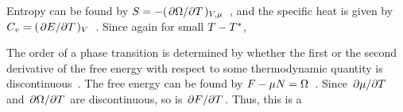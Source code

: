 {	Entropy can be found by $S = -(\pdv*{\Omega}{T})_{V, \mu}$~\cite[p.~150]{Landau}, and the specific heat is given by $C_v = (\pdv*{E}{T})_V$~\cite[p.~165]{Landau}.  Since
	again for small $T - T^*$,
	
	The order of a phase transition is determined by whether the first or the second derivative of the free energy with respect to some thermodynamic quantity is discontinuous~\cite{Wikipedia}.  The free energy can be found by $F - \mu N = \Omega$~\cite[p.~69]{Landau}.  Since $\pdv*{\mu}{T}$ and $\pdv*{\Omega}{T}$ are discontinuous, so is $\pdv*{F}{T}$.  Thus, this is a 
}

%
%


